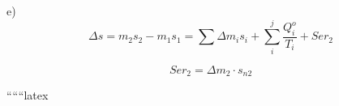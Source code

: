 e)
\[
\Delta s = m_2 s_2 - m_1 s_1 = \sum \Delta m_i s_i + \sum_i^j \frac{Q_i^o}{T_i} + Ser_2
\]

\[
Ser_2 = \Delta m_2 \cdot s_{n2}
\]

``````latex
